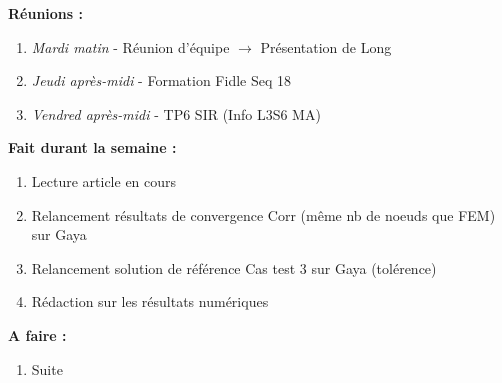 \textbf{Réunions :}
\begin{enumerate}[label=\textbullet]
	\item \textit{Mardi matin} - Réunion d'équipe $\rightarrow$ Présentation de Long
	\item \textit{Jeudi après-midi} - Formation Fidle Seq 18
	\item \textit{Vendred après-midi} - TP6 SIR (Info L3S6 MA)
\end{enumerate}
\textbf{Fait durant la semaine :}
\begin{enumerate}[label=\textbullet]
	\item Lecture article en cours
	\item Relancement résultats de convergence Corr (même nb de noeuds que FEM) sur Gaya
	\item Relancement solution de référence Cas test 3 sur Gaya (tolérence)
	\item Rédaction sur les résultats numériques
\end{enumerate}
\textbf{A faire :}
\begin{enumerate}[label=\textbullet]
	\item Suite 
\end{enumerate}